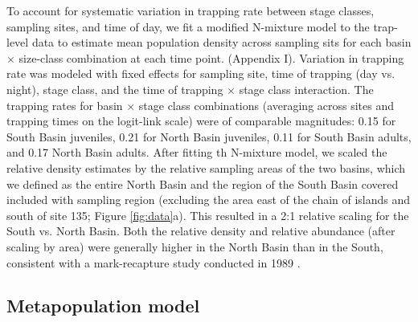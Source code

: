 \documentclass[11pt]{article}
\begin{document}
To account for systematic variation in trapping rate between stage classes,
sampling sites, and time of day, 
we fit a modified N-mixture model \citep{royle2004}
to the trap-level data to estimate mean population density across sampling sits 
for each basin $\times$ size-class combination at each time point.
(Appendix I). 
Variation in trapping rate was modeled with fixed effects for 
sampling site,
time of trapping (day vs. night),
stage class,
and the time of trapping $\times$ stage class interaction.
The trapping rates for basin $\times$ stage class combinations
(averaging across sites and trapping times on the logit-link scale) 
were of comparable magnitudes:
0.15 for South Basin juveniles,
0.21 for North Basin juveniles,
0.11 for South Basin adults, 
and 0.17 North Basin adults.
After fitting th N-mixture model,
we scaled the relative density estimates by the relative sampling areas of the two basins, 
which we defined as the entire North Basin and the region of the South Basin 
covered included with sampling region 
(excluding the area east of the chain of islands and south of site 135;
Figure \ref{fig:data}a).
This resulted in a 2:1 relative scaling for the South vs. North Basin.
Both the relative density and relative abundance (after scaling by area)
were generally higher in the North Basin than in the South,
consistent with a mark-recapture study conducted in 1989 \citep{gislason1998}.





\subsection*{Metapopulation model} 
\end{document}
